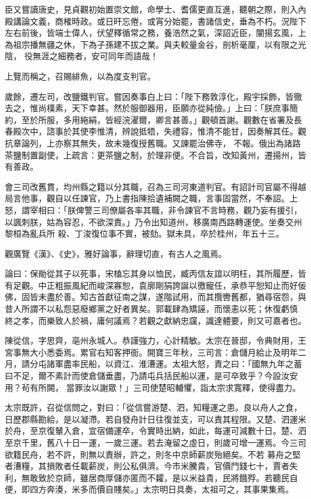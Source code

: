 \begin{pinyinscope}
 臣又嘗讀唐史，見貞觀初始置崇文館，命學士、耆儒更直互進，聽朝之際，則入內殿講論文義，商榷時政。或日旰忘倦，或宵分始罷，書諸信史，垂為不朽。況陛下左右前後，皆端士偉人，伏望釋循常之務，養浩然之氣，深詔近臣，闡揚玄風，上為祖宗播無疆之休，下為子孫建不拔之業。與夫較量金谷，剖析毫厘，以有限之光陰，
 役無涯之細務者，安可同年而語哉！



 上覽而稱之，召賜緋魚，以為度支判官。



 歲餘，遷左司，改鹽鐵判官。嘗因奏事白上曰：「陛下務敦淳化，殿宇採飾，皆徹去之，惟尚樸素，天下幸甚。然於服御器用，臣願亦從純儉。」上曰：「朕庶事簡約，至於所服，多用絁絹，皆經浣濯爾，卿言甚善。」觀頓首謝。觀數在省署及長春殿次中，諮事於其使李惟清，辨說抵牾，失禮容，惟清不能甘，因奏解其任。觀抗章論列，上亦察其無失，故未幾復授舊職。又諫罷治佛寺，
 不報。俄出為諸路茶鹽制置副使，上疏言：更茶鹽之制，於理非便。不合旨，改知黃州，遷揚州，皆有善政。



 會三司改舊貫，均州縣之籍以分其職，召為三司河東道判官。有詔計司官屬不得越局言他事，觀自以任諫官，乃上書指陳拾遺補闕之職，言事固當然，不奉詔。上怒，謂宰相曰：「朕俾警三司僚屬各率其職，非令諫官不言時務，觀乃妄有援引，以諷刺朕，姑為容忍，不欲深責。」乃令出知道州，移廣南西路轉運使。坐奏交州黎桓為亂兵所
 殺、丁浚復位事不實，被劾。獄未具，卒於桂州，年五十三。



 觀廣覽《漢》、《史》，雅好論事，辭理切直，有古人之風焉。



 論曰：保勛從其子以死事，宋榼忘其身以恤民，臧丙信友誼以明枉，其所履歷，皆有足觀。中正粗振風紀而峻深寡恕，袁廓剛狷誇誕以徼寵任，承恭平恕知止而好佞佛，固皆未盡於善。知古首獻征南之謀，遂階試用，而其攬轡舊都，猶尋宿怨，與昔人所謂不以私怨惡廢鄉黨之好者異矣。郭載肆為矯誣，而懷恚以死；休復虧慎
 終之孝，而樂致人於禍，庸何議焉？若觀之獻納忠讜，識達體要，則又可嘉者也。



 陳從信，字思齊，亳州永城人。恭謹強力，心計精敏。太宗在晉邸，令典財用，王宮事無大小悉委焉。累官右知客押衙。開寶三年秋，三司言：倉儲月給止及明年二月，請分屯諸軍盡率民船，以資江、淮漕運。太祖大怒，責之曰：「國無九年之蓄曰不足，爾不素計而使倉儲垂盡，乃請屯兵括民船以運，是可卒致乎？今設汝安用？茍有所闕，
 當罪汝以謝眾！」三司使楚昭輔懼，詣太宗求寬釋，使得盡力。



 太宗既許，召從信問之，對曰：「從信嘗游楚、泗，知糧運之患。良以舟人之食，日歷郡縣勘給，是以凝滯。若自發舟計日往復並支，可以責其程限。又楚、泗運米於舟，至京復輦入倉，宜宿備運卒，令實時出納，如此，每運可減數十日。楚、泗至京千里，舊八十日一運，一歲三運。若去淹留之虛日，則歲可增一運焉。今三司欲籍民舟，若不許，則無以責辦，許之，則冬中京師薪炭殆絕矣。不若
 募舟之堅者漕糧，其損敗者任載薪炭，則公私俱濟。今市米騰貴，官價鬥錢七十，賈者失利，無敢致於京師，雖居商厚儲亦匿而不糶，是以米益貴，民將餓殍。若聽民自便，即四方奔湊，米多而價自賤矣。」太宗明日具奏，太祖可之，其事果集焉。




\end{pinyinscope}
